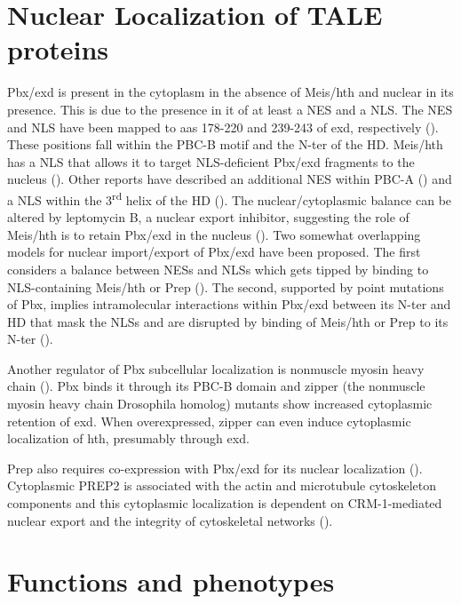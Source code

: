 \section{Nuclear Localization of TALE proteins}
\label{sec:nuclearLoc}

Pbx/exd is present in the cytoplasm in the absence of Meis/hth and nuclear in its presence. This is due to the presence in it of at least a \ac{NES} and a \ac{NLS}. The \ac{NES} and \ac{NLS} have been mapped to \acp{aa} 178-220 and 239-243 of exd, respectively (\cite{Abu-Shaar1999}). These positions fall within the PBC-B motif and the \ac{N-ter} of the \ac{HD}. Meis/hth has a \ac{NLS} that allows it to target \ac{NLS}-deficient Pbx/exd fragments to the nucleus (\cite{Abu-Shaar1999}). Other reports have described an additional \ac{NES} within PBC-A (\cite{Berthelsen1999}) and a \ac{NLS} within the 3\textsuperscript{rd} helix of the \ac{HD} (\cite{Saleh2000}). The nuclear/cytoplasmic balance can be altered by leptomycin B, a nuclear export inhibitor, suggesting the role of Meis/hth is to retain Pbx/exd in the nucleus (\cite{Berthelsen1999, Abu-Shaar1999}). Two somewhat overlapping models for nuclear import/export of Pbx/exd have been proposed. The first considers a balance between \acp{NES} and \acp{NLS} which gets tipped by binding to \ac{NLS}-containing Meis/hth or Prep (\cite{Affolter1999}). The second, supported by point mutations of Pbx, implies intramolecular interactions within Pbx/exd between its \ac{N-ter} and \ac{HD} that mask the \acp{NLS} and are disrupted by binding of Meis/hth or Prep to its \ac{N-ter} (\cite{Saleh2000}).

Another regulator of Pbx subcellular localization is nonmuscle myosin heavy chain (\cite{Huang2003}). Pbx binds it through its PBC-B domain and zipper (the nonmuscle myosin heavy chain Drosophila homolog) mutants show increased cytoplasmic retention of \ac{exd}. When overexpressed, zipper can even induce cytoplasmic localization of \ac{hth}, presumably through \ac{exd}.

Prep also requires co-expression with Pbx/exd for its nuclear localization (\cite{Berthelsen1999}). Cytoplasmic PREP2 is associated with the actin and microtubule cytoskeleton components and this cytoplasmic localization is dependent on CRM-1-mediated nuclear export and the integrity of cytoskeletal networks (\cite{Haller2004}).


\section{Functions and phenotypes}

